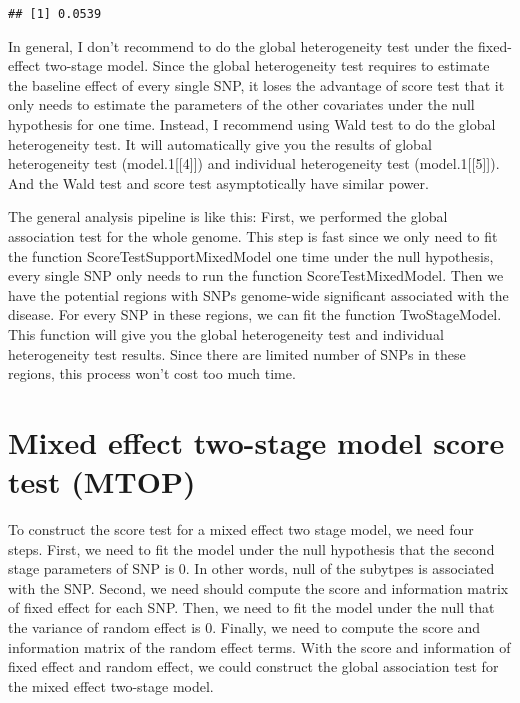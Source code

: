 \documentclass[11pt,]{article}
\begin{document}
\begin{verbatim}
## [1] 0.0539
\end{verbatim}

In general, I don't recommend to do the global heterogeneity test under
the fixed-effect two-stage model. Since the global heterogeneity test
requires to estimate the baseline effect of every single SNP, it loses
the advantage of score test that it only needs to estimate the
parameters of the other covariates under the null hypothesis for one
time. Instead, I recommend using Wald test to do the global
heterogeneity test. It will automatically give you the results of global
heterogeneity test (model.1{[}{[}4{]}{]}) and individual heterogeneity
test (model.1{[}{[}5{]}{]}). And the Wald test and score test
asymptotically have similar power.

The general analysis pipeline is like this: First, we performed the
global association test for the whole genome. This step is fast since we
only need to fit the function ScoreTestSupportMixedModel one time under
the null hypothesis, every single SNP only needs to run the function
ScoreTestMixedModel. Then we have the potential regions with SNPs
genome-wide significant associated with the disease. For every SNP in
these regions, we can fit the function TwoStageModel. This function will
give you the global heterogeneity test and individual heterogeneity test
results. Since there are limited number of SNPs in these regions, this
process won't cost too much time.

\hypertarget{mixed-effect-two-stage-model-score-test-mtop}{%
\section{Mixed effect two-stage model score test
(MTOP)}\label{mixed-effect-two-stage-model-score-test-mtop}}

To construct the score test for a mixed effect two stage model, we need
four steps. First, we need to fit the model under the null hypothesis
that the second stage parameters of SNP is 0. In other words, null of
the subytpes is associated with the SNP. Second, we need should compute
the score and information matrix of fixed effect for each SNP. Then, we
need to fit the model under the null that the variance of random effect
is 0. Finally, we need to compute the score and information matrix of
the random effect terms. With the score and information of fixed effect
and random effect, we could construct the global association test for
the mixed effect two-stage model.
\end{document}
